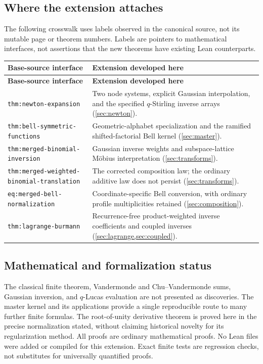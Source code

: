 \documentclass[11pt,a4paper]{article}
\numberwithin{equation}{section}
\theoremstyle{definition}
\theoremstyle{remark}
\begin{document}
\subsection{Where the extension attaches}
The following crosswalk uses labels observed in the canonical source, not its
mutable page or theorem numbers. Labels are pointers to mathematical interfaces,
not assertions that the new theorems have existing Lean counterparts.
\begin{longtable}{@{}>{\RaggedRight\arraybackslash}p{}>{\RaggedRight\arraybackslash}p{}@{}}
\toprule
\textbf{Base-source interface} & \textbf{Extension developed here}\\
\midrule
\endfirsthead
\toprule
\textbf{Base-source interface} & \textbf{Extension developed here}\\
\midrule
\endhead
\texttt{thm:newton-\allowbreak{}expansion} & Two node systems, explicit Gaussian interpolation, and the specified $q$-Stirling inverse arrays (\cref{sec:newton}).\\[1mm]
\texttt{thm:bell-\allowbreak{}symmetric-\allowbreak{}functions} & Geometric-alphabet specialization and the ramified shifted-factorial Bell kernel (\cref{sec:master}).\\[1mm]
\texttt{thm:merged-\allowbreak{}binomial-\allowbreak{}inversion} & Gaussian inverse weights and subspace-lattice M\"obius interpretation (\cref{sec:transforms}).\\[1mm]
\texttt{thm:merged-\allowbreak{}weighted-\allowbreak{}binomial-\allowbreak{}translation} & The corrected composition law; the ordinary additive law does not persist (\cref{sec:transforms}).\\[1mm]
\texttt{eq:merged-\allowbreak{}bell-\allowbreak{}normalization} & Coordinate-specific Bell conversion, with ordinary profile multiplicities retained (\cref{sec:composition}).\\[1mm]
\texttt{thm:lagrange-\allowbreak{}burmann} & Recurrence-free product-weighted inverse coefficients and coupled inverses (\cref{sec:lagrange,sec:coupled}).\\
\bottomrule
\end{longtable}

\subsection{Mathematical and formalization status}
The classical finite theorem, Vandermonde and Chu--Vandermonde sums,
Gaussian inversion, and $q$-Lucas evaluation are not presented as discoveries.
The master kernel and its applications provide a single reproducible route to
many further finite formulas. The root-of-unity derivative theorem is proved
here in the precise normalization stated, without claiming historical novelty
for its regularization method. All proofs are ordinary mathematical proofs.
No Lean files were added or compiled for this extension. Exact finite tests are
regression checks, not substitutes for universally quantified proofs.
\end{document}
